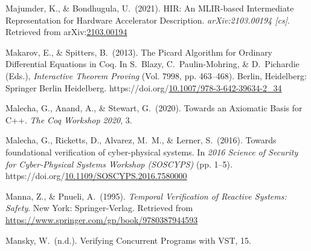 \documentclass[12pt,twoside]{article}
\begin{document}
{\begin{thebibliography}{1079}
\mdbibitemlabel{}Majumder, K., \& Bondhugula, U.~(2021). HIR: An MLIR-based Intermediate Representation for Hardware Accelerator Description. \emph{arXiv:2103.00194 {}[cs]}. Retrieved from arXiv:\href{http://arxiv.org/abs/2103.00194}{2103.00194}%

\mdbibitemlabel{}Makarov, E., \& Spitters, B.~(2013). The Picard Algorithm for Ordinary Differential Equations in Coq. In S.~Blazy, C.~Paulin-Mohring, \& D.~Pichardie (Eds.), \emph{Interactive Theorem Proving} (Vol. 7998, pp. 463–468). Berlin, Heidelberg: Springer Berlin Heidelberg. https://doi.org/\href{https://dx.doi.org/10.1007/978-3-642-39634-2_34}{10.1007/978-3-642-39634-2\_34}%

\mdbibitemlabel{}Malecha, G., Anand, A., \& Stewart, G.~(2020). Towards an Axiomatic Basis for C++. \emph{The Coq Workshop 2020}, 3.%

\mdbibitemlabel{}Malecha, G., Ricketts, D., Alvarez, M.~M., \& Lerner, S.~(2016). Towards foundational verification of cyber-physical systems. In \emph{2016 Science of Security for Cyber-Physical Systems Workshop (SOSCYPS)} (pp. 1–5). https://doi.org/\href{https://dx.doi.org/10.1109/SOSCYPS.2016.7580000}{10.1109/SOSCYPS.2016.7580000}%

\mdbibitemlabel{}Manna, Z., \& Pnueli, A.~(1995). \emph{Temporal Verification of Reactive Systems: Safety}. New York: Springer-Verlag. Retrieved from \href{https://www.springer.com/gp/book/9780387944593}{{\ttfamily https://\hspace{0pt}www.\hspace{0pt}springer.\hspace{0pt}com/\hspace{0pt}gp/\hspace{0pt}book/\hspace{0pt}9780387944593}}%

\mdbibitemlabel{}Mansky, W.~(n.d.). Verifying Concurrent Programs with VST, 15.%


\end{thebibliography}}
\end{document}

